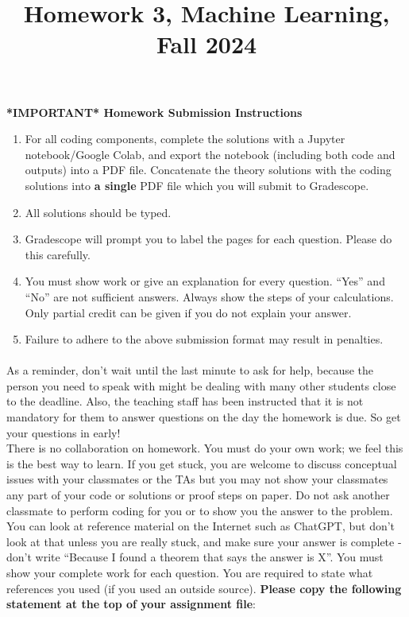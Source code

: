 \documentclass{exam}
\title{Homework 3, Machine Learning, Fall 2024}
\author{ }
\date{}
\begin{document}
\maketitle
\textbf{*IMPORTANT* Homework Submission Instructions}
\begin{enumerate}
    \item For all coding components, complete the solutions with a Jupyter notebook/Google Colab, and export the notebook (including both code and outputs) into a PDF file. Concatenate the theory solutions with the coding solutions into \textbf{a single} PDF file which you will submit to Gradescope. 
    \item All solutions should be typed. 
    \item Gradescope will prompt you to label the pages for each question. Please do this carefully. 
    \item You must show work or give an explanation for every question. ``Yes'' and ``No'' are not sufficient answers. Always show the steps of your calculations. Only partial credit can be given if you do not explain your answer.
    \item Failure to adhere to the above submission format may result in penalties.  
\end{enumerate}

\paragraph{} As a reminder, don’t wait until the last minute to ask for help, because the person you need to speak with might be dealing with many other students close to the deadline. Also, the teaching staff has been instructed that it is not mandatory for them to answer questions on the day the homework is due. So get your questions in early! \\

There is no collaboration on homework. You must do your own work; we feel this is the best way to learn. If you get stuck, you are welcome to discuss conceptual issues with your classmates or the TAs but you may not show your classmates any part of your code or solutions or proof steps on paper. Do not ask another classmate to perform coding for you or to show you the answer to the problem. You can look at reference material on the Internet such as ChatGPT, but don’t look at that unless you are really stuck, and make sure your answer is complete - don’t write “Because I found a theorem that says the answer is X”. You must show your complete work for each question. You are required to state what references you used (if you used an outside source). \textbf{Please copy the following statement at the top of your assignment file}: \\
\end{document}
